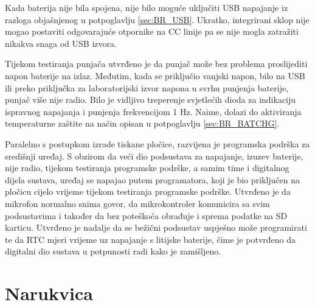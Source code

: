 Kada baterija nije bila spojena, nije bilo moguće uključiti USB napajanje iz razloga objašnjenog u potpoglavlju \ref{sec:BR_USB}. Ukratko, integrirani sklop nije mogao postaviti odgovarajuće otpornike na CC linije pa se nije mogla zatražiti nikakva snaga od USB izvora.

Tijekom testiranja punjača utvrđeno je da punjač može bez problema proslijediti napon baterije na izlaz. Međutim, kada se priključio vanjski napon, bilo na USB ili preko priključka za laboratorijski izvor napona u svrhu punjenja baterije, punjač više nije radio. Bilo je vidljivo treperenje svjetlećih dioda za indikaciju ispravnog napajanja i punjenja frekvencijom 1 Hz. Naime, dolazi do aktiviranja temperaturne zaštite na način opisan u potpoglavlju \ref{sec:BR_BATCHG}.

Paralelno s postupkom izrade tiskane pločice, razvijena je programska podrška za središnji uređaj. S obzirom da veći dio podsustava za napajanje, izuzev baterije, nije radio, tijekom testiranja programske podrške, a samim time i digitalnog dijela sustava, uređaj se napajao putem programatora, koji je bio priključen na pločicu cijelo vrijeme tijekom testiranja programske podrške. Utvrđeno je da mikrofon normalno snima govor, da mikrokontroler komunicira sa svim podsustavima i također da bez poteškoća obrađuje i sprema podatke na SD karticu. Utvrđeno je nadalje da se bežični podsustav uspješno može programirati te da RTC mjeri vrijeme uz napajanje s litijske baterije, čime je potvrđeno da digitalni dio sustava u potpunosti radi kako je zamišljeno.

\section{Narukvica}

